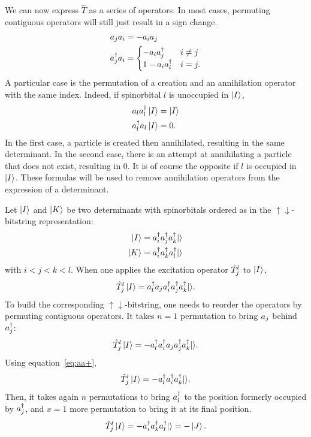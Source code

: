 \documentclass[./thesis.tex]{subfiles}
\begin{document}
We can now express $\hat T$ as a series of operators.
In most cases, permuting contiguous operators will still just result in a sign change.
\begin{align}
a_{j} a_{i} & = -a_{i} a_{j} \\
a^\dagger_{j} a_{i} & =
  \begin{cases}
  -a_{i} a^\dagger_{j} & i \ne j \\
  1 - a_{i} a^\dagger_{i} & i = j.
  \end{cases}
\end{align}
A particular case is the permutation of a creation and an annihilation operator with the same index.
Indeed, if spinorbital $l$ is unoccupied in $\ket{I}$,
\begin{align}
\label{eq:aa+}
a_{l} a^\dagger_{l} \ket{I} & = \ket{I}  \\
a^\dagger_{l} a_{l} \ket{I} & = 0 .
\end{align}
In the first case, a particle is created then annihilated, resulting in the same determinant. In the second case, there is an attempt at annihilating a particle that does not exist, resulting in $0$. It is of course the opposite if $l$ is occupied in $\ket{I}$.
These formulas will be used to remove annihilation operators from the expression of a determinant.


Let $\ket{I}$ and $\ket{K}$ be two determinants with spinorbitals ordered as in the $\uparrow \downarrow$-bitstring  representation:
\begin{align}
\ket{I} & = a^\dagger_{i}a^\dagger_{j}a^\dagger_{k} {\ket{}} \\
\ket{K} & = a^\dagger_{i}a^\dagger_{k}a^\dagger_{l} {\ket{}}
\end{align}
with $i<j<k<l$.
When one applies the excitation operator ${\hat{T}_{j}^{l}}$ to $\ket{I}$,
\begin{equation}
{\hat{T}_{j}^{l}} \ket{I} = a^\dagger_{l} a_{j} a^\dagger_{i} a^\dagger_{j} a^\dagger_{k} {\ket{}}.
\end{equation}
To build the corresponding $\uparrow \downarrow$-bitstring, one needs to
reorder the operators by permuting contiguous operators.
It takes $n=1$ permutation to bring $a_{j}$ behind $a^\dagger_{j}$:
\begin{equation}
{\hat{T}_{j}^{l}} \ket{I} = -a^\dagger_{l} a^\dagger_{i} a_{j} a^\dagger_{j} a^\dagger_{k} {\ket{}}.
\end{equation}
Using equation~\ref{eq:aa+},
\begin{equation}
{\hat{T}_{j}^{l}} \ket{I} = -a^\dagger_{l} a^\dagger_{i} a^\dagger_{k} {\ket{}}.
\end{equation}
Then, it takes again $n$ permutations to bring $a^\dagger_{l}$ to the position formerly occupied by $a^\dagger_{j}$, and $x=1$ more permutation to bring it at its final position.
\begin{equation}
{\hat{T}_{j}^{l}} \ket{I} = -a^\dagger_{i} a^\dagger_{k} a^\dagger_{l} {\ket{}} = -\ket{J}.
\end{equation}
\end{document}
